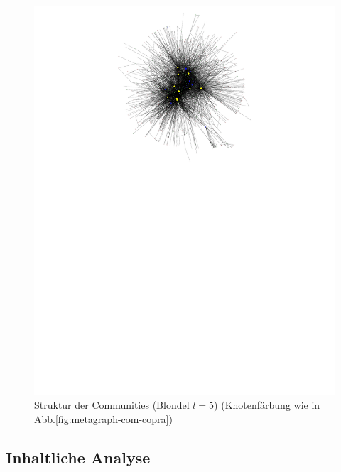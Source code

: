 \begin{figure}[h!]
  \centering
  \includegraphics[scale=1.6]{images/metagraph-blondel2-minsize4.pdf}
  \caption{Struktur der Communities (Blondel $l=5$) (Knotenfärbung
    wie in Abb.\ref{fig:metagraph-com-copra})}
  \label{fig:metagraph-com-blondel2}
\end{figure}

\subsection{Inhaltliche Analyse}
\label{sec:inhaltliche-analyse}

